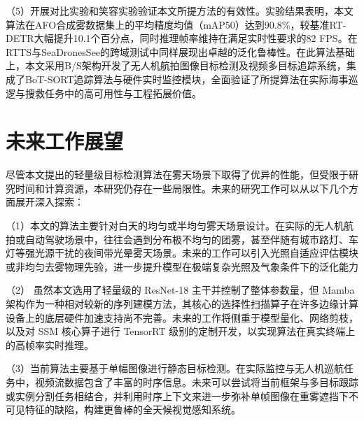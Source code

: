 （5）开展对比实验和笑容实验验证本文所提方法的有效性。实验结果表明，本文算法在AFO合成雾数据集上的平均精度均值（mAP50）达到90.8\%，较基准RT-DETR大幅提升10.1个百分点，同时推理帧率维持在满足实时性要求的82 FPS。在RTTS与SeaDronesSee的跨域测试中同样展现出卓越的泛化鲁棒性。在此算法基础上，本文采用B/S架构开发了无人机航拍图像目标检测及视频多目标追踪系统，集成了BoT-SORT追踪算法与硬件实时监控模块，全面验证了所提算法在实际海事巡逻与搜救任务中的高可用性与工程拓展价值。

\section{未来工作展望}
\label{sec:future_work}

尽管本文提出的轻量级目标检测算法在雾天场景下取得了优异的性能，但受限于研究时间和计算资源，本研究仍存在一些局限性。未来的研究工作可以从以下几个方面展开深入探索：

（1）本文的算法主要针对白天的均匀或半均匀雾天场景设计。在实际的无人机航拍或自动驾驶场景中，往往会遇到分布极不均匀的团雾，甚至伴随有城市路灯、车灯等强光源干扰的夜间带光晕雾天场景。未来的工作可以引入光照自适应评估模块或非均匀去雾物理先验，进一步提升模型在极端复杂光照及气象条件下的泛化能力

（2） 虽然本文选用了轻量级的 ResNet-18 主干并控制了整体参数量，但 Mamba 架构作为一种相对较新的序列建模方法，其核心的选择性扫描算子在许多边缘计算设备上的底层硬件加速支持尚不完善。未来的工作将侧重于模型量化、网络剪枝，以及对 SSM 核心算子进行 TensorRT 级别的定制开发，以实现算法在真实终端上的高帧率实时推理。

（3）当前算法主要基于单幅图像进行静态目标检测。在实际监控与无人机巡航任务中，视频流数据包含了丰富的时序信息。未来可以尝试将当前框架与多目标跟踪或实例分割任务相结合，并利用时序上下文来进一步弥补单帧图像在重雾遮挡下不可见特征的缺陷，构建更鲁棒的全天候视觉感知系统。